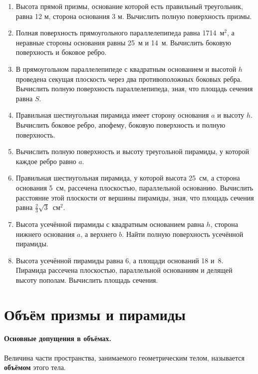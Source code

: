 \begin{enumerate}

\item
Высота прямой призмы, основание которой есть правильный треугольник, равна 12 м, сторона основания 3 м.
Вычислить полную поверхность призмы.

\item
Полная поверхность прямоугольного параллелепипеда равна 1714~м$^2$, а неравные стороны основания равны 25~м и 14~м.
Вычислить боковую поверхность и боковое ребро.

\item
В прямоугольном параллелепипеде с квадратным основанием и высотой $h$ проведена секущая плоскость через два противоположных боковых ребра.
Вычислить полную поверхность параллелепипеда, зная, что площадь сечения равна $S$.

\item
Правильная шестиугольная пирамида имеет сторону основания $a$ и высоту $h$.
Вычислить боковое ребро, апофему, боковую поверхность и полную поверхность.

\item
Вычислить полную поверхность и высоту треугольной пирамиды, у которой каждое ребро равно $a$.

\item
Правильная шестиугольная пирамида, у которой высота 25~см, а сторона основания 5~см, рассечена плоскостью, параллельной основанию.
Вычислить расстояние этой плоскости от вершины пирамиды, зная, что площадь сечения равна $\tfrac23\sqrt{3}$~см$^2$.

\item
Высота усечённой пирамиды с квадратным основанием равна $h$, сторона нижнего основания $a$, а верхнего $b$.
Найти полную поверхность усечённой пирамиды.

\item
Высота усечённой пирамиды равна 6, а площади оснований 18 и~8.
Пирамида рассечена плоскостью, параллельной основаниям и делящей высоту пополам.
Вычислить площадь сечения.
\end{enumerate}

\section{Объём призмы и пирамиды}

\paragraph{Основные допущения в объёмах.}\label{1938/s82}
Величина части пространства, занимаемого геометрическим телом, называется \textbf{объёмом} этого тела.

